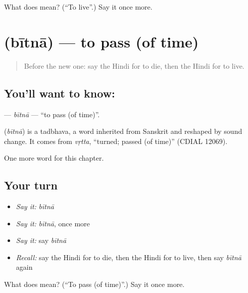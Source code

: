 \begin{tcolorbox}[breakable,colback=teal!4,colframe=teal!35!black,title={Before you move on}]
What does  mean? (\textquotedblleft{}To live\textquotedblright{}.) Say it once more.
\end{tcolorbox}
\section[\texorpdfstring{\hi{बीतना} (bītnā)}{बीतना (bītnā)}]{ (bītnā) — to pass (of time)}

\label{lesson:HI-C170-bitna}



\begin{quote}
Before the new one: say the Hindi for to die, then the Hindi for to live.
\end{quote}

\subsection*{You'll want to know: }
\textbf{} — \emph{bītnā} — \textquotedblleft{}to pass (of time)\textquotedblright{}.

\begin{cousinweb}
\textbf{} (\emph{bītnā}) is a tadbhava, a word inherited from Sanskrit and reshaped by sound change. It comes from \emph{vṛtta}, \textquotedblleft{}turned; passed (of time)\textquotedblright{} (CDIAL 12069).
\end{cousinweb}

\begin{grammarlens}[title={What you've built}]
One more word for this chapter.
\end{grammarlens}

\subsection*{Your turn}
\begin{itemize}
\raggedright
  \item \emph{Say it:} \emph{bītnā}
  \item \emph{Say it:} \emph{bītnā}, once more
  \item \emph{Say it:} say \emph{bītnā}
  \item \emph{Recall:} say the Hindi for to die, then the Hindi for to live, then say \emph{bītnā} again
\end{itemize}

\begin{tcolorbox}[breakable,colback=teal!4,colframe=teal!35!black,title={Before you move on}]
What does  mean? (\textquotedblleft{}To pass (of time)\textquotedblright{}.) Say it once more.
\end{tcolorbox}
